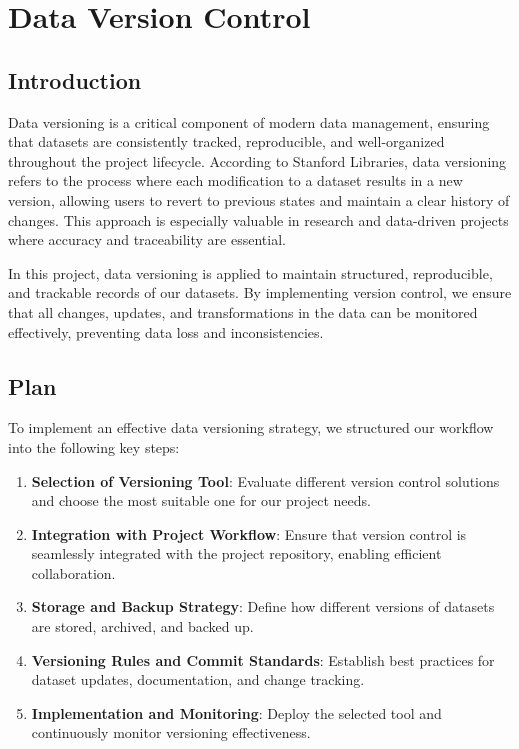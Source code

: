 \chapter{Data Version Control}

\section{Introduction}
Data versioning is a critical component of modern data management, ensuring that datasets are consistently tracked, reproducible, and well-organized throughout the project lifecycle. According to Stanford Libraries, data versioning refers to the process where each modification to a dataset results in a new version, allowing users to revert to previous states and maintain a clear history of changes. This approach is especially valuable in research and data-driven projects where accuracy and traceability are essential.

In this project, data versioning is applied to maintain structured, reproducible, and trackable records of our datasets. By implementing version control, we ensure that all changes, updates, and transformations in the data can be monitored effectively, preventing data loss and inconsistencies.

\section{Plan}
To implement an effective data versioning strategy, we structured our workflow into the following key steps:

\begin{enumerate}
    \item \textbf{Selection of Versioning Tool}: Evaluate different version control solutions and choose the most suitable one for our project needs.
    \item \textbf{Integration with Project Workflow}: Ensure that version control is seamlessly integrated with the project repository, enabling efficient collaboration.
    \item \textbf{Storage and Backup Strategy}: Define how different versions of datasets are stored, archived, and backed up.
    \item \textbf{Versioning Rules and Commit Standards}: Establish best practices for dataset updates, documentation, and change tracking.
    \item \textbf{Implementation and Monitoring}: Deploy the selected tool and continuously monitor versioning effectiveness.
\end{enumerate}


